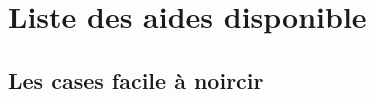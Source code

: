 
\newcommand{\tite}{{\Huge Manuel d'aide}\\Groupe B}
\newcommand{\titrehead}{Manuel d'aide}




\chapter{Liste des aides disponible}


\section{Les cases facile à noircir}
	\paragraph{}
